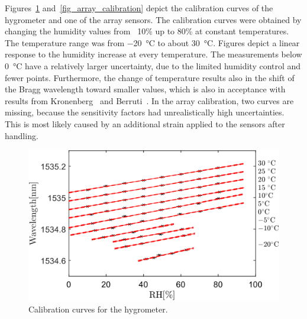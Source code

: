 \newpage
Figures~\ref{fig_single_calibration} and~\ref{fig_array_calibration} depict the calibration curves of the hygrometer and one of the array sensors. The calibration curves were obtained by changing the humidity values from ~10\% up to 80\% at constant temperatures. The temperature range was from \SI{-20}{\celsius} to about \SI{30}{\celsius}. Figures depict a linear response to the humidity increase at every temperature. The measurements below \SI{0}{\celsius} have a relatively larger uncertainty, due to the limited humidity control and fewer points. Furthermore, the change of temperature results also in the shift of the Bragg wavelength toward smaller values, which is also in acceptance with results from Kronenberg~\cite{Kronenberg:02} and Berruti~\cite{Berruti}. In the array calibration, two curves are missing, because the sensitivity factors had unrealistically high uncertainties. This is most likely caused by an additional strain applied to the sensors after handling. %

\begin{figure}[!h]
\centering
\includegraphics[width=0.8\columnwidth]{Chapter5/images/RHS.png}
\caption{Calibration curves for the hygrometer.}
\label{fig_single_calibration}
\end{figure}

